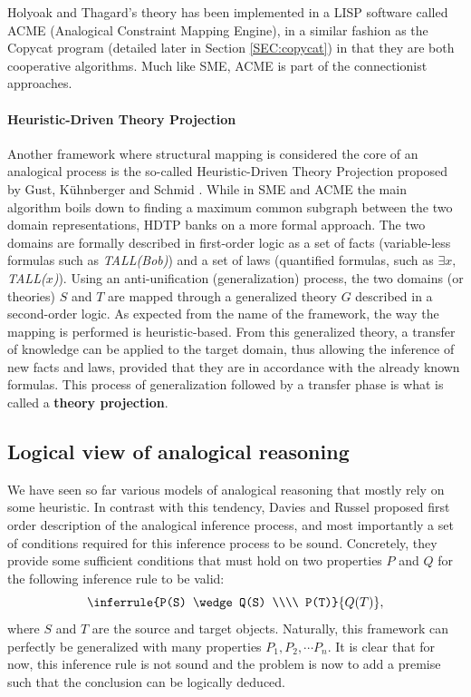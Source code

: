 Holyoak and Thagard's theory has been implemented in a LISP software called
ACME (Analogical Constraint Mapping Engine), in a similar fashion as the
Copycat program (detailed later in Section \ref{SEC:copycat}) in that they are
both cooperative algorithms. Much like SME, ACME is part of the connectionist
approaches.

\paragraph{Heuristic-Driven Theory Projection\\}

Another framework where structural mapping is considered the core of an
analogical process is the so-called Heuristic-Driven Theory Projection proposed
by Gust, K\"uhnberger and Schmid \cite{GusKunSchTCS06}. While in SME and ACME
the main algorithm boils down to finding a maximum common subgraph between the
two domain representations, HDTP banks on a more formal approach. The two
domains are formally described in first-order logic as a set of facts
(variable-less formulas such as \textit{TALL(Bob)}) and a set of laws
(quantified formulas, such as \textit{$\exists x,$ TALL($x$)}). Using an
anti-unification (generalization) process, the two domains (or theories) $S$
and $T$ are mapped through a generalized theory $G$ described in a second-order
logic. As expected from the name of the framework, the way the mapping is
performed is heuristic-based. From this generalized theory, a transfer of
knowledge can be applied to the target domain, thus allowing the inference of
new facts and laws, provided that they are in accordance with the already known
formulas.  This process of generalization followed by a transfer phase is what
is called a \textbf{theory projection}.

\subsection{Logical view of analogical reasoning}
\label{SEC:Davies_and_Russel}

We have seen so far various models of analogical reasoning that mostly rely on
some heuristic. In contrast with this tendency, Davies and Russel
\cite{DavRus87} proposed first order description of the analogical inference
process, and most importantly a set of conditions required for this inference
process to be sound.  Concretely, they provide some sufficient conditions that
must hold on two properties $P$ and $Q$ for the following inference rule to be
valid:
$$\inferrule{P(S) \wedge Q(S) \\\\ P(T)}{Q(T)},$$
where $S$ and $T$ are the source and target objects. Naturally, this framework
can perfectly be generalized with many properties $P_1, P_2, \cdots P_n$. It is
clear that for now, this inference rule is not sound and the problem is now to
add a premise such that the conclusion can be logically deduced.

